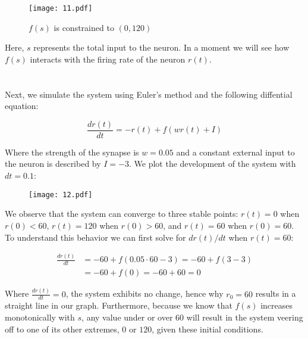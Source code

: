 \documentclass{article}
\begin{document}
\begin{figure}[ht]
    \centering
    \texttt{[image: 11.pdf]}
    \caption{$f(s)$ is constrained to $(0, 120)$}
\end{figure}

Here, $s$ represents the total input to the neuron. In a moment we will see how $f(s)$ interacts with the firing rate of the neuron $r(t)$.
\vspace{1em}



\section{}
Next, we simulate the system using Euler's method and the following diffential equation:

\begin{equation}
    \frac{dr(t)}{dt} = -r(t) + f(wr(t) + I)
\end{equation}
\vspace{.1em}

Where the strength of the synapse is $w = 0.05$ and a constant external input to the neuron is described by $I = -3$. We plot the development of the system with $dt = 0.1$:

\begin{figure}[ht]
    \centering
    \texttt{[image: 12.pdf]}
\end{figure}

\FloatBarrier
We observe that the system can converge to three stable points: $r(t) = 0$ when $r(0) < 60$, $r(t) = 120$ when $r(0) > 60$, and $r(t) = 60$ when $r(0) = 60$. To understand this behavior we can first solve for $dr(t)/dt$ when $r(t) = 60$:

\begin{align}
    \frac{dr(t)}{dt} &= -60 + f(0.05 \cdot 60 - 3) = -60 + f(3 - 3) \\[1em]
    &= -60 + f(0) = -60 + 60 = 0
\end{align}
\vspace{.1em}

Where $\frac{dr(t)}{dt} = 0$, the system exhibits no change, hence why $r_0 = 60$ results in a straight line in our graph. Furthermore, because we know that $f(s)$ increases monotonically with $s$, any value under or over $60$ will result in the system veering off to one of its other extremes, $0$ or $120$, given these initial conditions.
\vspace{1em}
\end{document}
